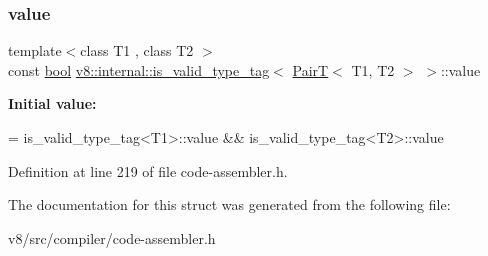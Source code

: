 \subsubsection{\texorpdfstring{value}{value}}
{\footnotesize\ttfamily template$<$class T1 , class T2 $>$ \\
const \mbox{\hyperlink{classbool}{bool}} \mbox{\hyperlink{structv8_1_1internal_1_1is__valid__type__tag}{v8\+::internal\+::is\+\_\+valid\+\_\+type\+\_\+tag}}$<$ \mbox{\hyperlink{structv8_1_1internal_1_1PairT}{PairT}}$<$ T1, T2 $>$ $>$\+::value\hspace{0.3cm}{\ttfamily [static]}}

{\bfseries Initial value\+:}
\begin{DoxyCode}
=
      is\_valid\_type\_tag<T1>::value && is\_valid\_type\_tag<T2>::value
\end{DoxyCode}


Definition at line 219 of file code-\/assembler.\+h.



The documentation for this struct was generated from the following file\+:\begin{DoxyCompactItemize}
\item 
v8/src/compiler/code-\/assembler.\+h\end{DoxyCompactItemize}
